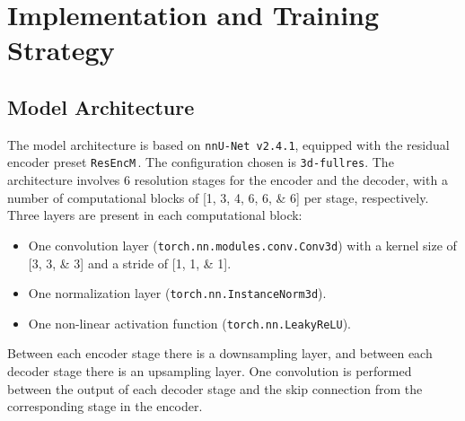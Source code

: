 \chapter{Implementation and Training Strategy} \label{chap:ImplementationAndTrainingStrategy}
\vspace{1cm}


\section{Model Architecture}
The model architecture is based on \texttt{nnU-Net v2.4.1}, equipped with the residual encoder preset \texttt{ResEncM}\,\cite{Isensee2024}. The configuration chosen is \texttt{3d-fullres}. The architecture involves \num{6} resolution stages for the encoder and the decoder, with a number of computational blocks of [\numlist[list-final-separator = {, }]{1;3;4;6;6;6}] per stage, respectively. Three layers are present in each computational block:
\begin{itemize}
    \item One convolution layer (\texttt{torch.nn.modules.conv.Conv3d}) with a kernel size of [\numlist[list-final-separator = {, }]{3;3;3}] and a stride of [\numlist[list-final-separator = {, }]{1;1;1}].
    \item One normalization layer (\texttt{torch.nn.InstanceNorm3d}).
    \item One non-linear activation function (\texttt{torch.nn.LeakyReLU}).
\end{itemize}
Between each encoder stage there is a downsampling layer, and between each decoder stage there is an upsampling layer. One convolution is performed between the output of each decoder stage and the skip connection from the corresponding stage in the encoder.

